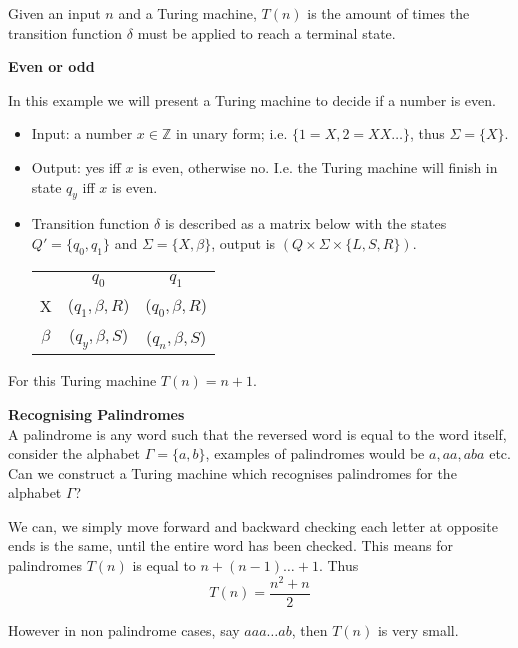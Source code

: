 \begin{definition}
    Given an input $n$ and a Turing machine,
    $T(n)$ is the amount of times the transition function 
    $\delta$ must be applied to reach a terminal state.
\end{definition}

\textbf{Even or odd}
\begin{example}
    In this example we will present a Turing machine to decide if a number is even.
    \begin{itemize}
        \item Input: a number $x \in \mathbb{Z}$ in unary form; i.e. $\{1 = X, 2 = XX\dots\}$,
            thus $\Sigma = \{X\}$.
        \item Output: yes iff $x$ is even, otherwise no. I.e. the Turing machine will finish
            in state $q_y$ iff $x$ is even.
        \item Transition function $\delta$ is described as a matrix below with the states
            $Q\prime = \{q_0,q_1\}$ and $\Sigma = \{X,\beta\}$,
            output is $(Q \times \Sigma \times \{L,S,R\})$.
            \begin{center}
                \begin{tabular}{ c c c }
                    & $q_0$           & $q_1$           \\
                    X    & ($q_1,\beta,R$) & ($q_0,\beta,R$) \\
                    $\beta$ & ($q_y,\beta,S$) & ($q_n,\beta,S$) \\
                \end{tabular}
            \end{center}
    \end{itemize}
    For this Turing machine $T(n) = n + 1$.
\end{example}

\textbf{Recognising Palindromes}\\
A palindrome is any word such that the reversed word is equal to the word itself,
consider the alphabet $\Gamma = \{a,b\}$, examples of palindromes would be $a, aa, aba$ etc.
Can we construct a Turing machine which recognises palindromes for the alphabet $\Gamma$?

We can, we simply move forward and backward checking each letter at opposite ends is the same,
until the entire word has been checked.
This means for palindromes $T(n)$ is equal to $n + (n - 1) \dots + 1$. Thus
$$T(n) = \frac{n^2 + n}{2}$$

However in non palindrome cases, say $aaa \dots ab$, then $T(n)$ is very small.

